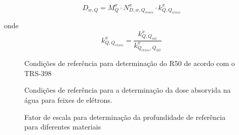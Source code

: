 \documentclass[11pt,a4paper]{article}
\begin{document}
	$$D_{w,Q} = M_{Q}^{x}\cdot N_{D,w,Q_{cross}}^{x} \cdot k_{Q,Q_{cross}}^{x} $$

	onde $$k_{Q,Q_{cross}}^{x} = \frac{k_{Q,Q_{int}}^{x}}{k_{Q_{cross}, Q_{int}}^{x}}$$

	\begin{figure}[h]
		\centering
		\caption{Condições de referência para determinação do R50 de acordo com o TRS-398}
		\label{fig:condicoesReferenciasR50}
	\end{figure}

	\begin{figure}[h]
		\centering
		\caption{Condições de referência para a determinação da dose absorvida na água para feixes de elétrons.}
		\label{fig:condicoesReferenciasDoseEletrons}
	\end{figure}

	\begin{figure}[h]
		\centering
		\caption{Fator de escala para determinação da profundidade de referência para diferentes materiais}
		\label{fig:fatorEscalaPhantons}
	\end{figure}
\end{document}
